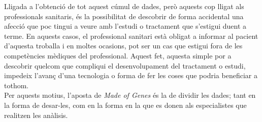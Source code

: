 \newline Lligada a l'obtenció de tot aquest cúmul de dades, però aquests cop lligat als professionals sanitaris, és la possibilitat de descobrir de forma accidental una afecció que poc tingui a veure amb l'estudi o tractament que s'estigui duent a terme. En aquests casos, el professional sanitari està obligat a informar al pacient d'aquesta troballa i en moltes ocasions, pot ser un cas que estigui fora de les competències mèdiques del professional. Aquest fet, aquesta simple por a descobrir quelcom que compliqui el desenvolupament del tractament o estudi, impedeix l'avanç d'una tecnologia o forma de fer les coses que podria beneficiar a tothom.\\
\newline Per aquests motius, l'aposta de \textit{Made of Genes} és la de dividir les dades; tant en la forma de desar-les, com en la forma en la que es donen als especialistes que realitzen les anàlisis.\\
